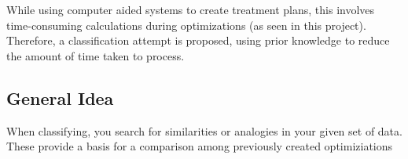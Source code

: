 While using computer aided systems to create treatment plans, this involves time-consuming calculations during optimizations (as seen in this project). Therefore, a classification attempt is proposed, using prior knowledge to reduce the amount of time taken to process.

\subsection{General Idea}
When classifying, you search for similarities or analogies in your given set of data. These provide a basis for a comparison among previously created optimiziations
